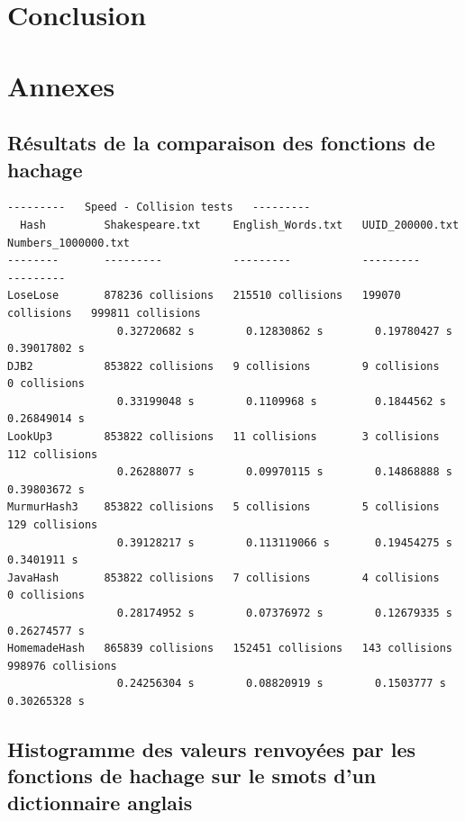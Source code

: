 \documentclass[12pt,a4paper,titlepage]{article}
\begin{document}
\newpage
\section*{Conclusion}


\newpage
\section*{Annexes}

\subsection*{Résultats de la comparaison des fonctions de hachage}
\label{exemple:hashFunctions}

\begin{verbatim}
---------   Speed - Collision tests   ---------
  Hash         Shakespeare.txt     English_Words.txt   UUID_200000.txt     Numbers_1000000.txt   
--------       ---------           ---------           ---------           ---------             
LoseLose       878236 collisions   215510 collisions   199070 collisions   999811 collisions     
                 0.32720682 s        0.12830862 s        0.19780427 s        0.39017802 s        
DJB2           853822 collisions   9 collisions        9 collisions        0 collisions          
                 0.33199048 s        0.1109968 s         0.1844562 s         0.26849014 s        
LookUp3        853822 collisions   11 collisions       3 collisions        112 collisions        
                 0.26288077 s        0.09970115 s        0.14868888 s        0.39803672 s        
MurmurHash3    853822 collisions   5 collisions        5 collisions        129 collisions        
                 0.39128217 s        0.113119066 s       0.19454275 s        0.3401911 s         
JavaHash       853822 collisions   7 collisions        4 collisions        0 collisions          
                 0.28174952 s        0.07376972 s        0.12679335 s        0.26274577 s        
HomemadeHash   865839 collisions   152451 collisions   143 collisions      998976 collisions     
                 0.24256304 s        0.08820919 s        0.1503777 s         0.30265328 s       
\end{verbatim}

\newpage
\subsection*{Histogramme des valeurs renvoyées par les fonctions de hachage sur le smots d'un dictionnaire anglais}
\label{exemple:hashFunctionsHistogram}
\end{document}
